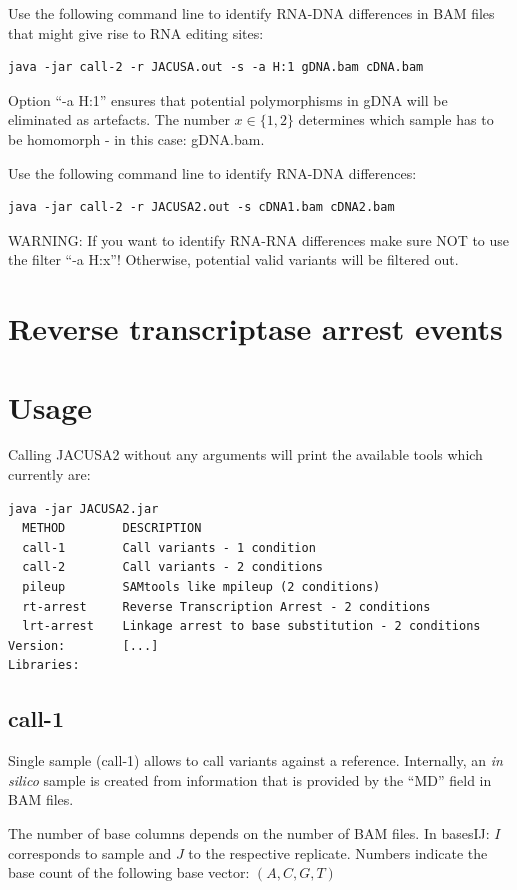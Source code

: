 \documentclass[10pt,a4paper]{article}
\begin{document}
Use the following command line to identify RNA-DNA differences in BAM files that might give rise to RNA editing sites:
\begin{verbatim}
java -jar call-2 -r JACUSA.out -s -a H:1 gDNA.bam cDNA.bam
\end{verbatim}
Option ``-a H:1'' ensures that potential polymorphisms in gDNA will be eliminated as artefacts. The number $x \in \{1, 2\}$
determines which sample has to be homomorph - in this case: gDNA.bam.

Use the following command line to identify RNA-DNA differences:
\begin{verbatim}
java -jar call-2 -r JACUSA2.out -s cDNA1.bam cDNA2.bam
\end{verbatim}
WARNING: If you want to identify RNA-RNA differences make sure NOT to use the filter ``-a H:x''! Otherwise, potential valid variants will be filtered out. 
\section{Reverse transcriptase arrest events}
\section{Usage}
Calling JACUSA2 without any arguments will print the available tools which currently are:
\begin{verbatim}
java -jar JACUSA2.jar
  METHOD        DESCRIPTION
  call-1        Call variants - 1 condition
  call-2        Call variants - 2 conditions
  pileup        SAMtools like mpileup (2 conditions)
  rt-arrest     Reverse Transcription Arrest - 2 conditions
  lrt-arrest    Linkage arrest to base substitution - 2 conditions
Version: 		[...]
Libraries: 	
\end{verbatim}
\subsection{call-1}
Single sample (call-1) allows to call variants against a reference. 
Internally, an \textit{in silico} sample is created from information that is provided by the ``MD'' field 
in BAM files.

The number of base columns depends on the number of BAM files. In basesIJ: $I$
corresponds to sample and $J$ to the respective replicate. Numbers indicate the base count of the
following base vector: $(A, C, G, T)$
\end{document}
